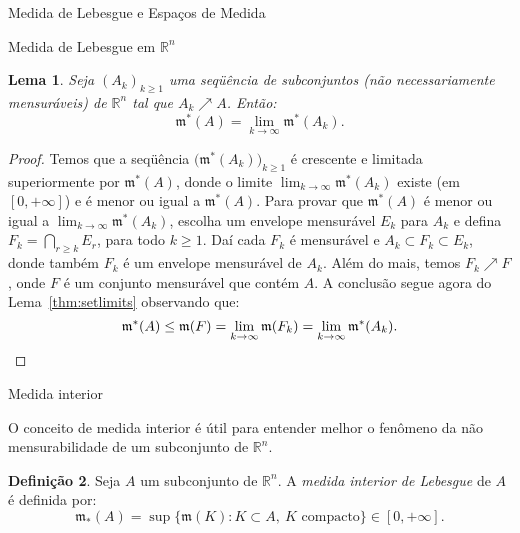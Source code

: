 \documentclass[oneside,final,11pt]{amsbook}
\newcommand{\R}{\mathds R}
\newcommand{\leb}{\mathfrak m}
\theoremstyle{remark}\newtheorem{exercise}{Exercício}[chapter]
\theoremstyle{remark}\newtheorem{*exercise}[exercise]{\hbox to 0pt{\hskip 0pt minus 1fil*}Exercício}
\theoremstyle{definition}\newtheorem{exdefin}{Definição}[chapter]
\theoremstyle{plain}\newtheorem{teo}{Teorema}[section]
\theoremstyle{plain}\newtheorem{lem}[teo]{Lema}
\theoremstyle{plain}\newtheorem{prop}[teo]{Proposição}
\theoremstyle{plain}\newtheorem{cor}[teo]{Corolário}
\theoremstyle{definition}\newtheorem{defin}[teo]{Definição}
\theoremstyle{remark}\newtheorem{rem}[teo]{Observação}
\theoremstyle{definition}\newtheorem{notation}[teo]{Notação}
\theoremstyle{definition}\newtheorem{convention}[teo]{Convenção}
\theoremstyle{definition}\newtheorem{example}[teo]{Exemplo}
\numberwithin{section}{chapter}
\numberwithin{equation}{section}
\begin{document}
\begin{chapter}{Medida de Lebesgue e Espaços de Medida}
\begin{section}[Medida de Lebesgue em $\R^n$]{Medida de Lebesgue em ${\R^n}$}
\begin{lem}
Seja $(A_k)_{k\ge1}$ uma seqüência de subconjuntos (não necessariamente mensuráveis) de $\R^n$ tal que
$A_k\nearrow A$. Então:
\[\leb^*(A)=\lim_{k\to\infty}\leb^*(A_k).\]
\end{lem}
\begin{proof}
Temos que a seqüência $\big(\leb^*(A_k)\big)_{k\ge1}$ é crescente e limitada superiormente
por $\leb^*(A)$, donde o limite $\lim_{k\to\infty}\leb^*(A_k)$ existe (em $[0,+\infty]$) e é menor ou igual a $\leb^*(A)$.
Para provar que $\leb^*(A)$ é menor ou igual a $\lim_{k\to\infty}\leb^*(A_k)$, escolha um envelope mensurável $E_k$ para $A_k$ e defina
$F_k=\bigcap_{r\ge k}E_r$, para todo $k\ge1$. Daí cada $F_k$ é mensurável e $A_k\subset F_k\subset E_k$,
donde também $F_k$ é um envelope mensurável de $A_k$. Além do mais, temos
$F_k\nearrow F$, onde $F$ é um conjunto mensurável que contém $A$. A conclusão segue agora do Lema~\ref{thm:setlimits} observando que:
\[\leb^*(A)\le\leb(F)=\lim_{k\to\infty}\leb(F_k)=\lim_{k\to\infty}\leb^*(A_k).\qedhere\]
\end{proof}

\begin{subsection}{Medida interior}

O conceito de medida interior é útil para entender melhor o fenômeno da não mensurabilidade de um subconjunto
de $\R^n$.

\begin{defin}
Seja $A$ um subconjunto de $\R^n$. A {\em medida interior de Lebesgue\/}
de $A$ é definida por:
\index[simbolos]{$\leb_*(A)$}\[\leb_*(A)=\sup\big\{\leb(K):K\subset A,\ \text{$K$ compacto}\big\}\in[0,+\infty].\]
\end{defin}


\end{subsection}
\end{section}
\end{chapter}
\end{document}
